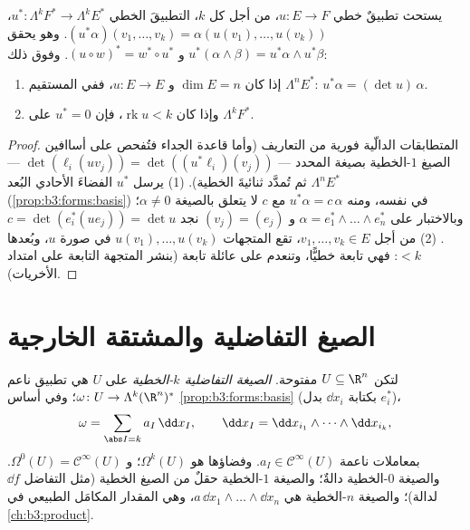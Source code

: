 \begin{proposition}
\label{prop:b3:forms:linearpullback}
يستحث تطبيقٌ خطي $u\colon E \to F$، من أجل كل $k$، التطبيقَ الخطي $u^*\colon \Lambda^kF^* \to \Lambda^kE^*$،
$(u^*\alpha)(v_1, \dots, v_k) = \alpha(u(v_1), \dots,
u(v_k))$. وهو يحقق $u^*(\alpha \wedge \beta) = u^*\alpha
\wedge u^*\beta$ و $(u \circ w)^* = w^* \circ u^*$. وفوق ذلك:
\begin{enumerate}
  \item إذا كان $\dim E = n$ و $u\colon E \to E$، ففي المستقيم
        $\Lambda^nE^*$: $u^*\alpha = (\det u)\,\alpha$.
  \item وإذا كان $\operatorname{rk}u < k$، فإن $u^* = 0$ على $\Lambda^kF^*$.
\end{enumerate}
\end{proposition}

\begin{proof}
المتطابقات الدالّية فورية من التعاريف (وأما قاعدة الجداء
فتُفحص على أساافين الصيغ $1$-الخطية بصيغة المحدد --- $\det(\ell_i(uv_j)) =
\det((u^*\ell_i)(v_j))$ ---
ثم تُمدَّد ثنائيةَ الخطية).
(1) يرسل $u^*$ الفضاءَ الأحادي البُعد $\Lambda^nE^*$
(\cref{prop:b3:forms:basis}) في نفسه، ومنه $u^*\alpha =
c\,\alpha$ مع $c$ لا يتعلق بالصيغة
$\alpha \neq 0$؛ وبالاختبار على $\alpha = e_1^* \wedge \dots \wedge e_n^*$ و $(v_j) =
(e_j)$ نجد $c = \det(e_i^*(ue_j)) = \det u$.
(2) من أجل $v_1, \dots, v_k \in E$، تقع المتجهات $u(v_1), \dots,
u(v_k)$ في صورة $u$، وبُعدها
$< k$: فهي تابعة خطيًّا، وتنعدم  على عائلة
تابعة (بنشر المتجهة التابعة على امتداد الأخريات).
\end{proof}

\section{الصيغ التفاضلية والمشتقة الخارجية}

\begin{definition}\label{def:b3:forms:diffform}
لتكن $U \subseteq \R^n$ مفتوحة. \emph{الصيغة التفاضلية
$k$-الخطية} على $U$ هي تطبيق ناعم $\omega\colon U \to \Lambda^k(\R^n)^*$؛
وفي أساس \cref{prop:b3:forms:basis} (بكتابة $\dd x_i$ بدل $e_i^*$)،
\[
\omega = \sum_{\abs I = k} a_I\,\dd x_I,
\qquad
\dd x_I = \dd x_{i_1} \wedge \dots \wedge \dd x_{i_k},
\]
بمعاملات ناعمة $a_I \in \mathcal C^\infty(U)$. وفضاؤها هو $\Omega^k(U)$؛ و $\Omega^0(U) = \mathcal
C^\infty(U)$.
والصيغة $0$-الخطية دالةٌ؛ والصيغة $1$-الخطية حقلٌ من الصيغ
الخطية (مثل التفاضل $\dd f$ لدالة)؛ والصيغة $n$-الخطية هي
$a\,\dd x_1\wedge\dots\wedge\dd
x_n$، وهي المقدار المكامَل الطبيعي في \cref{ch:b3:product}.
\end{definition}

